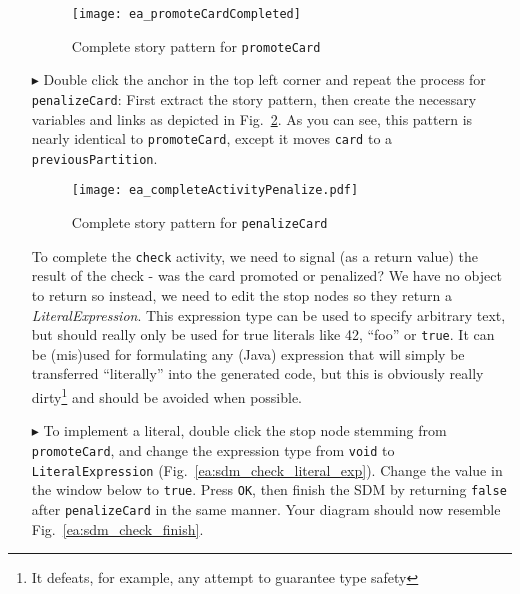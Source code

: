 \begin{itemize}
\begin{figure}[htbp]
\begin{center}
  \texttt{[image: ea\_promoteCardCompleted]}
  \caption{Complete story pattern for \texttt{promoteCard}}
  \label{ea:sdm_check_complete_activity_node}
\end{center}
\end{figure}

\clearpage

\item[$\blacktriangleright$] Double click the anchor in the top left corner and repeat the process for \texttt{penalizeCard}: First extract the story pattern,
then create the necessary variables and links as depicted in Fig.~\ref{ea:sdm_check_complete_penalize}. As you can see, this pattern is nearly identical to
\texttt{promoteCard}, except it moves \texttt{card} to a \texttt{previousPartition}.

\vspace{0.5cm}

\begin{figure}[htbp]
\begin{center}
  \texttt{[image: ea\_completeActivityPenalize.pdf]}
  \caption{Complete story pattern for \texttt{penalizeCard}}
  \label{ea:sdm_check_complete_penalize}
\end{center}
\end{figure}


\vspace{0.5cm}

To complete the \texttt{check} activity, we need to signal (as a return value) the result of the check - was the card promoted or penalized? We have no object
to return so instead, we need to edit the stop nodes so they return a \emph{LiteralExpression}. This expression type can be used to
specify arbitrary text, but should really only be used for true literals like 42, ``foo'' or \texttt{true}. It can be (mis)used for formulating any (Java)
expression that will simply be transferred ``literally'' into the generated code, but this is obviously really dirty\footnote{It defeats, for example, any
attempt to guarantee type safety} and should be avoided when possible.

\vspace{0.5cm}

\item[$\blacktriangleright$] To implement a literal, double click the stop node stemming from  \texttt{promoteCard}, and change the expression type from
\texttt{void} to \texttt{LiteralEx\-pression} (Fig.~\ref{ea:sdm_check_literal_exp}). Change the value in the window below to \texttt{true}. Press \texttt{OK},
then finish the SDM by returning \texttt{false} after \texttt{penalizeCard} in the same manner. Your diagram should now resemble
Fig.~\ref{ea:sdm_check_finish}.


\end{itemize}
